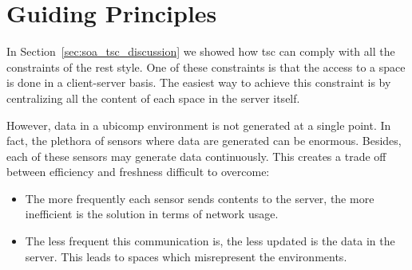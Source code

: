 \section{Guiding Principles} %
\label{sec:guiding_principles}

In Section~\ref{sec:soa_tsc_discussion} we showed how \ac{tsc} can comply with all the constraints of the \ac{rest} style.
One of these constraints is that the access to a space is done in a client-server basis.
The easiest way to achieve this constraint is by centralizing all the content of each space in the server itself.


However, data in a \ac{ubicomp} environment is not generated at a single point. %
In fact, the plethora of sensors where data are generated can be enormous. %
Besides, each of these sensors may generate data continuously.
This creates a trade off between efficiency and freshness difficult to overcome:
\begin{itemize}
  \item The more frequently each sensor sends contents to the server, the more inefficient is the solution in terms of network usage.
  \item The less frequent this communication is, the less updated is the data in the server.
        This leads to spaces which misrepresent the environments.
\end{itemize}



